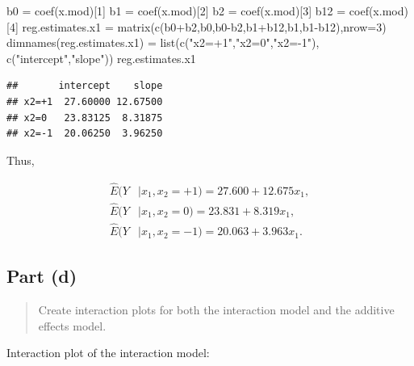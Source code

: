 \documentclass[
]{article}
\newenvironment{Shaded}{\begin{snugshade}}{\end{snugshade}}
\newcommand{\AttributeTok}[1]{\textcolor[rgb]{0.77,0.63,0.00}{#1}}
\newcommand{\DecValTok}[1]{\textcolor[rgb]{0.00,0.00,0.81}{#1}}
\newcommand{\FunctionTok}[1]{\textcolor[rgb]{0.00,0.00,0.00}{#1}}
\newcommand{\NormalTok}[1]{#1}
\newcommand{\OtherTok}[1]{\textcolor[rgb]{0.56,0.35,0.01}{#1}}
\newcommand{\SpecialCharTok}[1]{\textcolor[rgb]{0.00,0.00,0.00}{#1}}
\newcommand{\StringTok}[1]{\textcolor[rgb]{0.31,0.60,0.02}{#1}}
\begin{document}
\begin{Shaded}
\begin{Highlighting}[]
\NormalTok{b0 }\OtherTok{=} \FunctionTok{coef}\NormalTok{(x.mod)[}\DecValTok{1}\NormalTok{]}
\NormalTok{b1 }\OtherTok{=} \FunctionTok{coef}\NormalTok{(x.mod)[}\DecValTok{2}\NormalTok{]}
\NormalTok{b2 }\OtherTok{=} \FunctionTok{coef}\NormalTok{(x.mod)[}\DecValTok{3}\NormalTok{]}
\NormalTok{b12 }\OtherTok{=} \FunctionTok{coef}\NormalTok{(x.mod)[}\DecValTok{4}\NormalTok{]}
\NormalTok{reg.estimates.x1 }\OtherTok{=} \FunctionTok{matrix}\NormalTok{(}\FunctionTok{c}\NormalTok{(b0}\SpecialCharTok{+}\NormalTok{b2,b0,b0}\SpecialCharTok{{-}}\NormalTok{b2,b1}\SpecialCharTok{+}\NormalTok{b12,b1,b1}\SpecialCharTok{{-}}\NormalTok{b12),}\AttributeTok{nrow=}\DecValTok{3}\NormalTok{)}
\FunctionTok{dimnames}\NormalTok{(reg.estimates.x1) }\OtherTok{=} \FunctionTok{list}\NormalTok{(}\FunctionTok{c}\NormalTok{(}\StringTok{"x2=+1"}\NormalTok{,}\StringTok{"x2=0"}\NormalTok{,}\StringTok{"x2={-}1"}\NormalTok{),}
                                  \FunctionTok{c}\NormalTok{(}\StringTok{"intercept"}\NormalTok{,}\StringTok{"slope"}\NormalTok{))}
\NormalTok{reg.estimates.x1}
\end{Highlighting}
\end{Shaded}

\begin{verbatim}
##       intercept    slope
## x2=+1  27.60000 12.67500
## x2=0   23.83125  8.31875
## x2=-1  20.06250  3.96250
\end{verbatim}

Thus,

\begin{align*}
\hat{E}(Y&|x_1,x_2=+1)  = 27.600 + 12.675 x_1,\\
\hat{E}(Y&|x_1,x_2=0)  = 23.831 + 8.319 x_1,\\
\hat{E}(Y&|x_1,x_2=-1) = 20.063 + 3.963 x_1.
\end{align*}

\hypertarget{part-d}{%
\subsection{Part (d)}\label{part-d}}

\begin{quote}
Create interaction plots for both the interaction model and the additive
effects model.
\end{quote}

Interaction plot of the interaction model:
\end{document}
